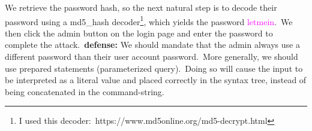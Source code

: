 \documentclass[11pt]{article}
\begin{document}
\noindent
We retrieve the password hash, so the next natural step is to decode their password using a md5\_hash decoder\footnote{I used this decoder:\ https://www.md5online.org/md5-decrypt.html}, which yields the password \textcolor{magenta}{letmein}.\ We then click the admin button on the login page and enter the password to complete the attack.\ \textbf{defense:} We should mandate that the admin always use a different password than their user account password.\ More generally, we should use prepared statements (parameterized query).\ Doing so will cause the input to be interpreted as a literal value and placed correctly in the syntax tree, instead of being concatenated in the command-string.\
\end{document}

